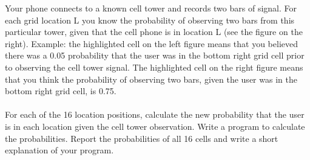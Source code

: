 \documentclass[12pt]{article}%
\begin{document}
Your phone connects to a known cell tower and records two bars of signal. For each grid location L you know the probability of observing two bars from this particular tower, given that the cell phone is in location L (see the figure on the right). Example: the highlighted cell on the left figure means that you believed there was a 0.05 probability that the user was in the bottom right grid cell prior to observing the cell tower signal. The highlighted cell on the right figure means that you think the probability of observing two bars, given the user was in the bottom right grid cell, is 0.75.
\\ \\
For each of the 16 location positions, calculate the new probability that the user is in each location given the cell tower observation. Write a program to calculate the probabilities. Report the probabilities of all 16 cells and write a short explanation of your program.
\newpage
\end{document}
